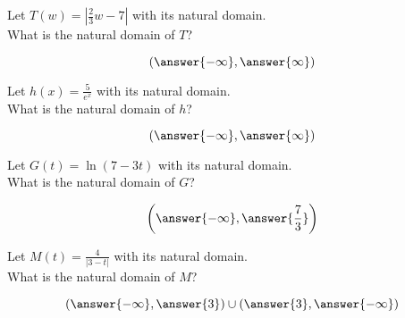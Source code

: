 \documentclass{ximera}
\author{Lee Wayand}
\begin{document}
\begin{exercise}








\begin{question}


Let $T(w) = | \tfrac{2}{3} w - 7 |$ with its natural domain. \\

What is the natural domain of $T$?

\[
\left( \answer{-\infty},  \answer{\infty}  \right)
\]


\end{question}







\begin{question}


Let $h(x) = \frac{5}{e^x}$ with its natural domain. \\

What is the natural domain of $h$?

\[
\left( \answer{-\infty},  \answer{\infty}  \right)
\]


\end{question}








\begin{question}


Let $G(t) = \ln(7 - 3t)$ with its natural domain. \\

What is the natural domain of $G$?

\[
\left(  \answer{-\infty}, \answer{\frac{7}{3}}  \right)
\]


\end{question}








\begin{question}


Let $M(t) = \frac{4}{| 3 - t |}$ with its natural domain. \\

What is the natural domain of $M$?

\[
\left( \answer{-\infty}, \answer{3} \right) \cup  \left( \answer{3} , \answer{-\infty} \right) 
\]


\end{question}













\end{exercise}
\end{document}
